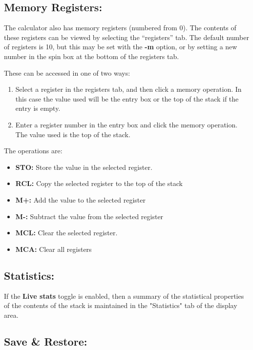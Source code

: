 \documentclass{article}
\begin{document}
  \subsection{Memory Registers:}

  The calculator also has memory registers (numbered from 0). The
  contents of these registers can be viewed by selecting the
  ``registers'' tab. The default number of registers is 10, but this
  may be set with the \textbf{-m} option, or by setting a new number in
  the spin box at the bottom of the registers tab.

  These can be accessed in one of two ways:
  \begin{enumerate}
  \item Select a register in the registers tab, and then click a memory
    operation. In this case the value used will be the entry box or the
    top of the stack if the entry is empty.
  \item Enter a register number in the entry box and click the memory
    operation. The value used is the top of the stack.
  \end{enumerate}

  The operations are:
  \begin{itemize}
  \item \textbf{STO:} Store the value in the selected register.
  \item \textbf{RCL:} Copy the selected register to the top of the
    stack
  \item \textbf{M+:} Add the value to the selected register
  \item \textbf{M-:} Subtract the value from the selected register
  \item \textbf{MCL:} Clear the selected register.
  \item \textbf{MCA:} Clear all registers

  \end{itemize}

  \subsection{Statistics:}

  If the \textbf{Live stats} toggle is enabled, then a summary of the
  statistical properties of the contents of the stack is maintained in
  the "Statistics" tab of the display area. 

  \subsection{Save \& Restore:}
\end{document}
